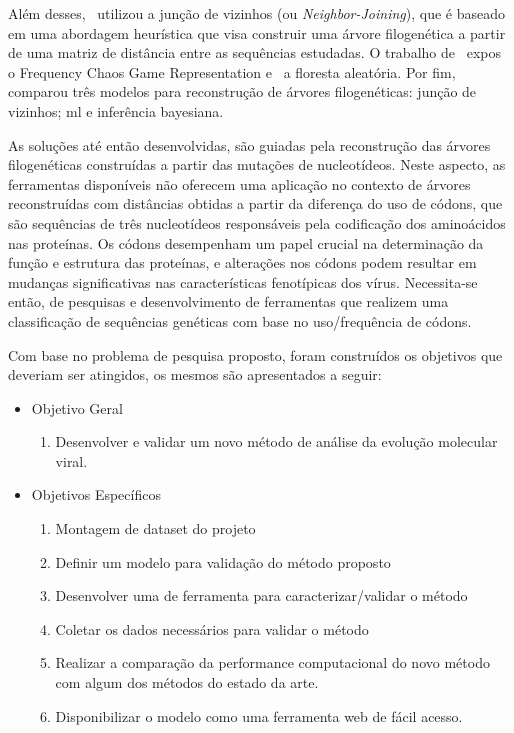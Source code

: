 Além desses,~\citeauthor{potdar_phylogenetic_2021} utilizou a junção de vizinhos (ou \textit{Neighbor-Joining}), que é baseado em uma abordagem heurística que visa construir uma árvore filogenética a partir de uma matriz de distância entre as sequências estudadas. O trabalho de~\citeauthor{lichtblau_alignment-free_2019} expos o Frequency Chaos Game Representation e~\citeauthor{kim_ngs_2022} a floresta aleatória. Por fim,~\citeauthor{dimitrov_updated_2019} comparou três modelos para reconstrução de árvores filogenéticas: junção de vizinhos; \gls{ml} e inferência bayesiana.

As soluções até então desenvolvidas, são guiadas pela reconstrução das árvores filogenéticas construídas a partir das mutações de nucleotídeos. Neste aspecto, as ferramentas disponíveis não oferecem uma aplicação no contexto de árvores reconstruídas com distâncias obtidas a partir da diferença do uso de códons, que são sequências de três nucleotídeos responsáveis pela codificação dos aminoácidos nas proteínas. Os códons desempenham um papel crucial na determinação da função e estrutura das proteínas, e alterações nos códons podem resultar em mudanças significativas nas características fenotípicas dos vírus. Necessita-se então, de pesquisas e desenvolvimento de ferramentas que realizem uma classificação de sequências genéticas com base no uso/frequência de códons.


Com base no problema de pesquisa proposto, foram construídos os objetivos que deveriam ser atingidos, os mesmos são apresentados a seguir:
\begin{itemize}
  \item Objetivo Geral
        \begin{enumerate}[label=~(\roman*)]
          \item Desenvolver e validar um novo método de análise da evolução molecular viral.
        \end{enumerate}
  \item Objetivos Específicos
        \begin{enumerate}[label=~(\roman*)]
          \item Montagem de dataset do projeto
          \item Definir um modelo para validação do método proposto
          \item Desenvolver uma de ferramenta para caracterizar/validar o método
          \item Coletar os dados necessários para validar o método
          \item Realizar a comparação da performance computacional do novo método com algum dos métodos do estado da arte.
          \item Disponibilizar o modelo como uma ferramenta web de fácil acesso.
        \end{enumerate}
\end{itemize}

